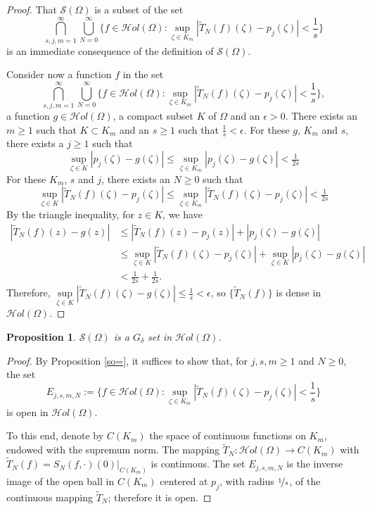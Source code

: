 \documentclass[11pt,twoside,a4paper]{article}
\newtheorem{proposition}[theorem]{Proposition}
\theoremstyle{remark}
\def\d{\delta}
\newcommand{\holo}{{\mathcal Hol}(\Omega)}
\newcommand{\ttn}{\widetilde{T}_N}
\newcommand{\so}{\mathcal{S}(\Omega)}
\begin{document}
\begin{proof}
  That $\so$ is a subset of the set
  \begin{equation*}
    \bigcap\limits_{s,j,m=1}^{\infty}\bigcup\limits_{N=0}^{\infty}\big\{ f \in \holo: \sup\limits_{\zeta \in K_m}|\ttn (f)(\zeta)-p_j(\zeta)| < \frac{1}{s}\big\}
  \end{equation*}
  is an immediate consequence of the definition of $\so$.
   \par
   Consider now a function $f$ in the set
   \begin{equation*}
     \bigcap\limits_{s,j,m=1}^{\infty}\bigcup\limits_{N=0}^{\infty}\big\{ f \in \holo: \sup\limits_{\zeta \in K_m}|\ttn (f)(\zeta)-p_j(\zeta)| < \frac{1}{s}\big\},
   \end{equation*}
    a function $g \in \holo$, a compact subset $K$ of $\Omega$ and an $\epsilon >0$. There exists an $m \geq 1$ such that $K \subset K_m$ and an $s \geq 1$ such that $\tfrac{1}{s}< \epsilon$. For these $g$, $K_m$ and $s$, there exists a $j \geq 1$ such that
  \begin{equation*}
   \sup\limits_{\zeta \in K} |p_j(\zeta)-g(\zeta)| \leq \sup\limits_{\zeta \in K_m} |p_j(\zeta)-g(\zeta)|< \tfrac{1}{2s}
  \end{equation*}
For these $K_m$, $s$ and $j$, there exists an $N \geq 0$ such that
  \begin{equation*}
  \sup\limits_{\zeta \in K} |\ttn(f)(\zeta)- p_j(\zeta)| \leq  \sup\limits_{\zeta \in K_m} |\ttn(f)(\zeta)- p_j(\zeta)|< \tfrac{1}{2s}
  \end{equation*}
  By the triangle inequality, for $z \in K$, we have
  \begin{align*}
    |\ttn(f)(z)- g(z)|& \leq |\ttn(f)(z)- p_j(z)|+|p_j(\zeta)-g(\zeta)| \\
    & \leq \sup\limits_{\zeta \in K} |\ttn(f)(\zeta)- p_j(\zeta)| +\sup\limits_{\zeta \in K} |p_j(\zeta)-g(\zeta)|\\
    &< \frac{1}{2s} + \frac{1}{2s}.
  \end{align*}
  Therefore, $\sup\limits_{\zeta \in K} |\ttn(f)(\zeta)- g(\zeta)| \leq \tfrac{1}{s}< \epsilon$, so $\{\ttn(f)\}$ is dense in $\holo$.
\end{proof}
\begin{proposition}
  \label{so g_d}
  $\so$ is a $G_\d$ set in $\holo$.
\end{proposition}
\begin{proof}
  By Proposition \ref{so=}, it suffices to show that, for $j,s,m \geq 1$ and $N \geq 0$, the set
  \begin{equation*}
   E_{j,s,m,N}:= \big\{f \in \holo: \sup\limits_{\zeta \in K_m}|\ttn (f)(\zeta)-p_j(\zeta)| < \frac{1}{s} \big\}
  \end{equation*}
  is open in $\holo$.
   \par
   To this end, denote by $C(K_m)$ the space of continuous functions on $K_m$, endowed with the supremum norm. The mapping $\ttn : \holo \rightarrow C(K_m)$ with $\ttn(f)= S_N(f, \cdot)(0) \big| _{C(K_m)}$ is continuous. The set $E_{j,s,m,N}$ is the inverse image of the open ball in $C(K_m)$ centered at $p_j$, with radius $\nicefrac{1}{s}$, of the continuous mapping $\ttn$; therefore it is open.
\end{proof}
\end{document}
